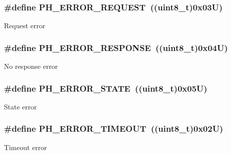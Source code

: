 \subsubsection[{\texorpdfstring{P\+H\+\_\+\+E\+R\+R\+O\+R\+\_\+\+R\+E\+Q\+U\+E\+ST}{PH_ERROR_REQUEST}}]{\setlength{\rightskip}{0pt plus 5cm}\#define P\+H\+\_\+\+E\+R\+R\+O\+R\+\_\+\+R\+E\+Q\+U\+E\+ST~((uint8\+\_\+t)0x03\+U)}\hypertarget{group___p_h___error___code_ga76393e5665e76130e95c73aab378c53d}{}\label{group___p_h___error___code_ga76393e5665e76130e95c73aab378c53d}
Request error 
\subsubsection[{\texorpdfstring{P\+H\+\_\+\+E\+R\+R\+O\+R\+\_\+\+R\+E\+S\+P\+O\+N\+SE}{PH_ERROR_RESPONSE}}]{\setlength{\rightskip}{0pt plus 5cm}\#define P\+H\+\_\+\+E\+R\+R\+O\+R\+\_\+\+R\+E\+S\+P\+O\+N\+SE~((uint8\+\_\+t)0x04\+U)}\hypertarget{group___p_h___error___code_ga104872de885107db19b579c81a62f563}{}\label{group___p_h___error___code_ga104872de885107db19b579c81a62f563}
No response error 
\subsubsection[{\texorpdfstring{P\+H\+\_\+\+E\+R\+R\+O\+R\+\_\+\+S\+T\+A\+TE}{PH_ERROR_STATE}}]{\setlength{\rightskip}{0pt plus 5cm}\#define P\+H\+\_\+\+E\+R\+R\+O\+R\+\_\+\+S\+T\+A\+TE~((uint8\+\_\+t)0x05\+U)}\hypertarget{group___p_h___error___code_ga495ce5ac265432fc88f35462ea1515f8}{}\label{group___p_h___error___code_ga495ce5ac265432fc88f35462ea1515f8}
State error 
\subsubsection[{\texorpdfstring{P\+H\+\_\+\+E\+R\+R\+O\+R\+\_\+\+T\+I\+M\+E\+O\+UT}{PH_ERROR_TIMEOUT}}]{\setlength{\rightskip}{0pt plus 5cm}\#define P\+H\+\_\+\+E\+R\+R\+O\+R\+\_\+\+T\+I\+M\+E\+O\+UT~((uint8\+\_\+t)0x02\+U)}\hypertarget{group___p_h___error___code_gaae8d2172a18fdde6957c77af378c2574}{}\label{group___p_h___error___code_gaae8d2172a18fdde6957c77af378c2574}
Timeout error 